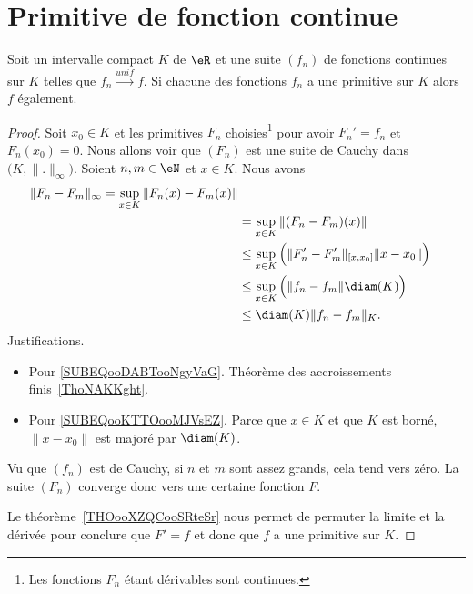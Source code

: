 \section{Primitive de fonction continue}

\begin{proposition}    \label{PropQACVooBnHtRJ}
	Soit un intervalle compact \( K\) de \( \eR\) et une suite \( (f_n)\) de fonctions continues sur \( K\) telles que \( f_n\stackrel{unif}{\longrightarrow}f\). Si chacune des fonctions \( f_n\) a une primitive sur \( K\) alors \( f\) également.
\end{proposition}

\begin{proof}
	Soit \( x_0\in K\) et les primitives \( F_n\) choisies\footnote{Les fonctions \( F_n\) étant dérivables sont continues.} pour avoir \( F_n'=f_n\) et \( F_n(x_0)=0\). Nous allons voir que \( (F_n)\) est une suite de Cauchy dans \( \big( K,\| . \|_{\infty} \big)\). Soient \( n,m\in \eN\) et \( x\in K\). Nous avons
	\begin{subequations}
		\begin{align}
			\| F_n-F_m \|_{\infty}=\sup_{x\in K}\| F_n(x)-F_m(x) \|                                                                   \\
			 & =\sup_{x\in K}\| (F_n-F_m)(x) \|                                                                                       \\
			 & \leq\sup_{x\in K}\Big( \| F_n'-F_m' \|_{\mathopen[ x , x_0 \mathclose]}\| x-x_0 \| \Big)   \label{SUBEQooDABTooNgyVaG} \\
			 & \leq\sup_{x\in K}\Big( \| f_n-f_m \|\diam(K) \Big) \label{SUBEQooKTTOooMJVsEZ}                                         \\
			 & \leq \diam(K)\| f_n-f_m \|_K.
		\end{align}
	\end{subequations}
	Justifications.
	\begin{itemize}
		\item Pour \eqref{SUBEQooDABTooNgyVaG}. Théorème des accroissements finis~\ref{ThoNAKKght}.
		\item Pour \eqref{SUBEQooKTTOooMJVsEZ}. Parce que \( x\in K\) et que \( K\) est borné, \( \| x-x_0 \|\) est majoré par \( \diam(K)\).
	\end{itemize}
	Vu que \( (f_n) \) est de Cauchy, si \( n\) et \( m\) sont assez grands, cela tend vers zéro. La suite \( (F_n)\) converge donc vers une certaine fonction \( F\).

	Le théorème~\ref{THOooXZQCooSRteSr} nous permet de permuter la limite et la dérivée pour conclure que \( F'=f\) et donc que \( f\) a une primitive sur \( K\).
\end{proof}

